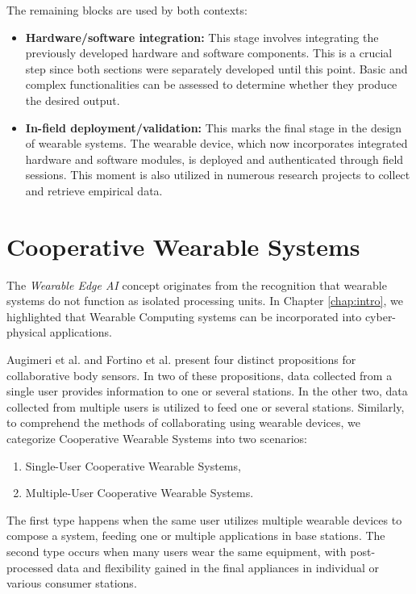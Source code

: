 The remaining blocks are used by both contexts:

\begin{itemize}
    \item \textbf{Hardware/software integration:} This stage involves integrating the previously developed hardware and software components. This is a crucial step since both sections were separately developed until this point. Basic and complex functionalities can be assessed to determine whether they produce the desired output.
    
    \item \textbf{In-field deployment/validation:} This marks the final stage in the design of wearable systems. The wearable device, which now incorporates integrated hardware and software modules, is deployed and authenticated through field sessions. This moment is also utilized in numerous research projects to collect and retrieve empirical data. 
\end{itemize}

\section{Cooperative Wearable Systems}

The \textit{Wearable Edge AI} concept originates from the recognition that wearable systems do not function as isolated processing units. In Chapter \ref{chap:intro}, we highlighted that Wearable Computing systems can be incorporated into cyber-physical applications.

Augimeri et al. \cite{augimeri2011collaborative} and Fortino et al. \cite{fortino2015framework} present four distinct propositions for collaborative body sensors. In two of these propositions, data collected from a single user provides information to one or several stations. In the other two, data collected from multiple users is utilized to feed one or several stations. Similarly, to comprehend the methods of collaborating using wearable devices, we categorize Cooperative Wearable Systems into two scenarios:

\begin{enumerate}
    \item Single-User Cooperative Wearable Systems,
    \item Multiple-User Cooperative Wearable Systems.
\end{enumerate}

The first type happens when the same user utilizes multiple wearable devices to compose a system, feeding one or multiple applications in base stations. The second type occurs when many users wear the same equipment, with post-processed data and flexibility gained in the final appliances in individual or various consumer stations.


